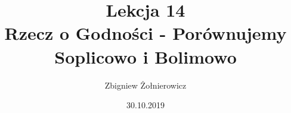\documentclass[a4paper]{article}
\begin{document}
\title{{\huge Lekcja 14} \\
{\large Rzecz o Godności - Porównujemy Soplicowo i Bolimowo}}
\author{Zbigniew Żołnierowicz}
\date{30.10.2019}
\maketitle
\end{document}

